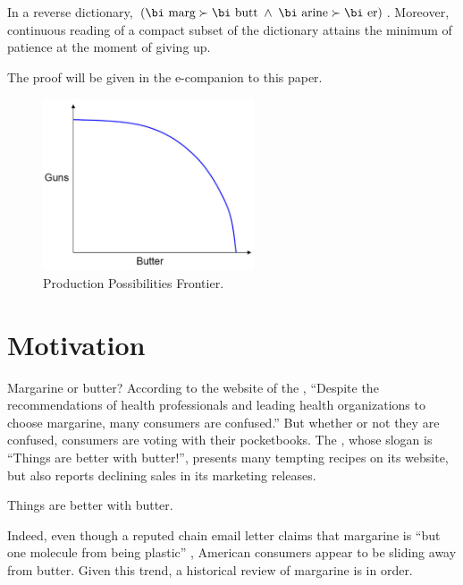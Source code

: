\documentclass[opre,nonblindrev]{informs3} %
\begin{document}
\begin{theorem}
\label{marg-butt-th}
In a reverse dictionary, $(\mbox{\bi marg}\succ\mbox{\bi butt\/}\; \land\;
\mbox{\bi arine}\succ\mbox{\bi er})$.
Moreover, continuous reading of a compact subset of the dictionary
attains the minimum of patience at the moment of giving up.
\end{theorem}

The proof will be given in the e-companion to this paper.



\begin{figure}[t]
\begin{center}
\includegraphics[height=2in]{Sample-Figure}
\caption{Production Possibilities Frontier.} \label{frontier}
\end{center}
\end{figure}

\section{Motivation}

Margarine or butter? According to the website of the
\cite{namm}, ``Despite the
recommendations of health professionals and leading health
organizations to choose margarine, many consumers are confused.''
But whether or not they are confused, consumers are voting with
their pocketbooks.  The
\cite{abi}, whose
slogan is ``Things are better with butter!'', presents many tempting
recipes on its website, but also reports declining sales in its
marketing releases.

\begin{hypothesis}
Things are better with butter.
\end{hypothesis}

Indeed, even though a reputed chain email letter claims that margarine is ``but
one molecule from being plastic''
\citep{btc},
American consumers appear to be
sliding away from butter. Given this trend, a historical review of
margarine is in order.
\end{document}
